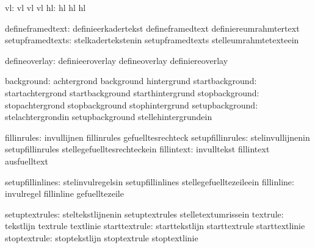                            vl:  vl                           vl
                                vl
                           hl:  hl                           hl
                                hl

             defineframedtext:  definieerkadertekst          defineframedtext
                                definiereumrahmtertext
             setupframedtexts:  stelkadertekstenin           setupframedtexts
                                stelleumrahmtetexteein

                defineoverlay:  definieeroverlay             defineoverlay
                                definiereoverlay

                   background:  achtergrond                  background
                                hintergrund
              startbackground:  startachtergrond             startbackground
                                starthintergrund
               stopbackground:  stopachtergrond              stopbackground
                                stophintergrund
              setupbackground:  stelachtergrondin            setupbackground
                                stellehintergrundein

                  fillinrules:  invullijnen                  fillinrules
                                gefuelltesrechteck
             setupfillinrules:  stelinvullijnenin            setupfillinrules
                                stellegefuelltesrechteckein
                   fillintext:  invulltekst                  fillintext
                                ausfuelltext

             setupfillinlines:  stelinvulregelsin            setupfillinlines
                                stellegefuelltezeileein
                   fillinline:  invulregel                   fillinline
                                gefuelltezeile

               setuptextrules:  steltekstlijnenin            setuptextrules
                                stelletextumrissein
                     textrule:  tekstlijn                    textrule
                                textlinie
                starttextrule:  starttekstlijn               starttextrule
                                starttextlinie
                 stoptextrule:  stoptekstlijn                stoptextrule
                                stoptextlinie


